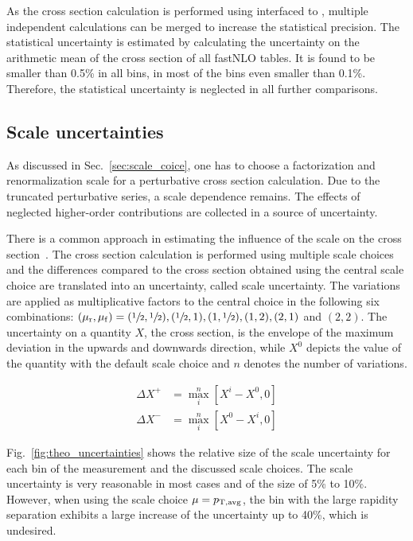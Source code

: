 As the cross section calculation is performed using \fastNLO interfaced to
\NLOJETPP, multiple independent calculations can be merged to increase the
statistical precision. The statistical uncertainty is estimated by calculating
the uncertainty on the arithmetic mean of the cross section of all fastNLO
tables. It is found to be smaller than 0.5\% in all
bins, in most of the bins even smaller than 0.1\%. Therefore, the statistical
uncertainty is neglected in all further comparisons.

\subsection{Scale uncertainties}
\label{sec:scale_uncertainties}

As discussed in Sec.~\ref{sec:scale_coice}, one has to choose a factorization
and renormalization scale for a perturbative cross section calculation. Due to
the truncated perturbative series, a scale dependence remains. The effects of
neglected higher-order contributions are collected in a source of uncertainty.

There is a common approach in estimating the influence of the scale on the cross
section~\cite{Banfi:2010xy}. The cross section calculation is performed using
multiple scale choices and the differences compared to the cross section
obtained using the central scale choice are translated into an uncertainty,
called scale uncertainty. The variations are applied as multiplicative factors
to the central choice in the following six combinations: $(\mu_{\mathrm{r}}, \mu_{\mathrm{f}}) =
(\sfrac{1}{2}, \sfrac{1}{2}), (\sfrac{1}{2}, 1), (1, \sfrac{1}{2}), (1, 2), (2,
1)$ and $(2, 2)$. The uncertainty on a quantity $X$, \eg the cross section, is
the envelope of the maximum deviation in the upwards and downwards direction,
while $X^0$ depicts the value of the quantity with the default scale choice and
$n$ denotes the number of variations.

\begin{align*}
    \Delta X^+ &= \max_{i}^{n} \left[ X^i - X^0, 0 \right]\\
    \Delta X^- &= \max_{i}^{n} \left[ X^0 - X^i, 0 \right]
\end{align*}


Fig.~\ref{fig:theo_uncertainties} shows the relative size of the scale
uncertainty for each bin of the measurement and the discussed scale choices. The
scale uncertainty is very reasonable in most cases and of the size of 5\% to
10\%. However, when using the scale choice $\mu=p_{\mathrm{T,avg}}$, the bin with the large
rapidity separation exhibits a large increase of the uncertainty up to 40\%,
which is undesired.


